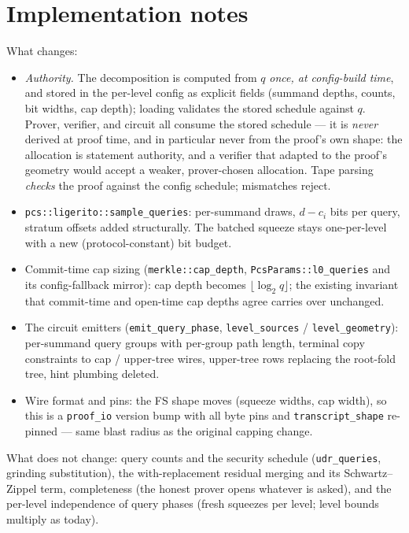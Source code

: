 \documentclass[11pt]{article}
\newcommand{\code}[1]{\texttt{#1}}
\theoremstyle{definition}
\begin{document}
\section{Implementation notes}

What changes:
\begin{itemize}[leftmargin=2em]
\item \emph{Authority.} The decomposition is computed from $q$
\emph{once, at config-build time}, and stored in the per-level
config as explicit fields (summand depths, counts, bit widths, cap
depth); loading validates the stored schedule against $q$. Prover,
verifier, and circuit all consume the stored schedule --- it is
\emph{never} derived at proof time, and in particular never from the
proof's own shape: the allocation is statement authority, and a
verifier that adapted to the proof's geometry would accept a weaker,
prover-chosen allocation. Tape parsing \emph{checks} the proof
against the config schedule; mismatches reject.
\item \code{pcs::ligerito::sample\_queries}: per-summand draws,
$d - c_i$ bits per query, stratum offsets added structurally. The
batched squeeze stays one-per-level with a new (protocol-constant)
bit budget.
\item Commit-time cap sizing (\code{merkle::cap\_depth},
\code{PcsParams::l0\_queries} and its config-fallback mirror): cap
depth becomes $\lfloor \log_2 q \rfloor$; the existing invariant that
commit-time and open-time cap depths agree carries over unchanged.
\item The circuit emitters (\code{emit\_query\_phase},
\code{level\_sources} / \code{level\_geometry}): per-summand query
groups with per-group path length, terminal copy constraints to cap /
upper-tree wires, upper-tree rows replacing the root-fold tree, hint
plumbing deleted.
\item Wire format and pins: the FS shape moves (squeeze widths, cap
width), so this is a \code{proof\_io} version bump with all byte pins
and \code{transcript\_shape} re-pinned --- same blast radius as the
original capping change.
\end{itemize}

What does not change: query counts and the security schedule
(\code{udr\_queries}, grinding substitution), the with-replacement
residual merging and its Schwartz--Zippel term, completeness (the
honest prover opens whatever is asked), and the per-level independence
of query phases (fresh squeezes per level; level bounds multiply as
today).
\end{document}
